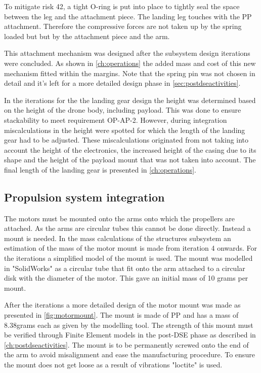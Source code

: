 To mitigate risk 42, a tight O-ring is put into place to tightly seal the space between the leg and the attachment piece. The landing leg touches with the PP attachment. Therefore the compressive forces are not taken up by the spring loaded but but by the attachment piece and the arm. 

This attachment mechanism was designed after the subsystem design iterations were concluded. As shown in \autoref{ch:operations} the added mass and cost of this new mechanism fitted within the margins. Note that the spring pin was not chosen in detail and it's left for a more detailed design phase in \autoref{sec:postdseactivities}. 

In the iterations for the the landing gear design the height was determined based on the height of the drone body, including payload. This was done to ensure stackability to meet requirement OP-AP-2. However, during integration miscalculations in the height were spotted for which the length of the landing gear had to be adjusted. These miscalculations originated from not taking into account the height of the electronics, the increased height of the casing due to its shape and the height of the payload mount that was not taken into account. The final length of the landing gear is presented in \autoref{ch:operations}.

\subsection{Propulsion system integration} \label{subsec:propintegr}
The motors must be mounted onto the arms onto which the propellers are attached. As the arms are circular tubes this cannot be done directly. Instead a mount is needed. In the mass calculations of the structures subsystem an estimation of the mass of the motor mount is made from iteration 4 onwards. For the iterations a simplified model of the mount is used. The mount was modelled in "SolidWorks" as a circular tube that fit onto the arm attached to a circular disk with the diameter of the motor. This gave an initial mass of 10 grams per mount.

After the iterations a more detailed design of the motor mount was made as presented in \autoref{fig:motormount}. The mount is made of PP and has a mass of 8.38grams each as given by the modelling tool. The strength of this mount must be verified through Finite Element models in the post-DSE phase as described in \autoref{ch:postdseactivities}. The mount is to be permanently screwed onto the end of the arm to avoid misalignment and ease the manufacturing procedure. To ensure the mount does not get loose as a result of vibrations "loctite" \cite{loctite} is used.

